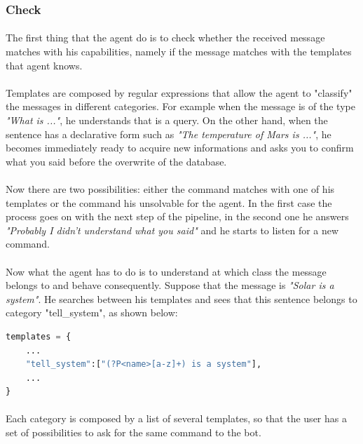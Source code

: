 \documentclass[12pt, a4paper]{article}
\begin{document}
\subsubsection{Check}
\paragraph{}
The first thing that the agent do is to check whether the received message matches with his capabilities, namely if the message matches with the templates that agent knows.
\paragraph{}
Templates are composed by regular expressions that allow the agent to "classify" the messages in different categories. For example when the message is of the type \textit{"What is ..."}, he understands that is a query. On the other hand, when the sentence has a declarative form such as \textit{"The temperature of Mars is ..."}, he becomes immediately ready to acquire new informations and asks you to confirm what you said before the  overwrite of the database.
\paragraph{}
Now there are two possibilities: either the command matches with one of his templates or the command his unsolvable for the agent.
In the first case the process goes on with the next step of the pipeline, in the second one he answers \textit{"Probably I didn't understand what you said"} and he starts to listen for a new command. 
\paragraph{}
Now what the agent has to do is to understand at which class the message belongs to and behave consequently.
Suppose that the message is \textit{"Solar is a system"}. He searches between his templates and sees that this sentence belongs to category "tell\_system", as shown below:
\vspace{1em}
\begin{lstlisting}[language=Python]
templates = {
	...
	"tell_system":["(?P<name>[a-z]+) is a system"],
	...
}
\end{lstlisting}
\paragraph{}
Each category is composed by a list of several templates, so that the user has a set of possibilities to ask for the same command to the bot.
\end{document}

